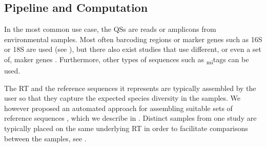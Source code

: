 

\subsection{Pipeline and Computation}
\label{ch:Foundations:sec:PhylogeneticPlacement:sub:PipelineAndComputation}



In the most common use case, the \acp{QS} are reads or amplicons from environmental samples.
Most often barcoding regions or marker genes such as 16S or 18S are used
(see ),
but there also exist studies that use different, or even a set of, maker genes \citep{Sunagawa2013a}.
Furthermore, other types of sequences such as \textsubscript{mi}tags \citep{Logares2014} can be used.

The \ac{RT} and the reference sequences it represents are typically assembled by the user
so that they capture the expected species diversity in the samples.
We however proposed an automated approach for assembling suitable sets of reference sequences \cite{Czech2018},
which we describe in .
Distinct samples from one study are typically placed on the same underlying \ac{RT}
in order to facilitate comparisons between the samples,
see .

